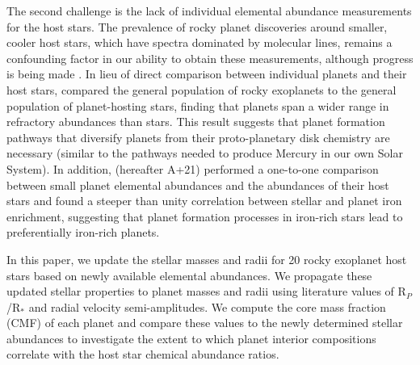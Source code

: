 \documentclass[twocolumn]{aastex631}
\begin{document}
The second challenge is the lack of individual elemental abundance measurements for the host stars. The prevalence of rocky planet discoveries around smaller, cooler host stars, which have spectra dominated by molecular lines, remains a confounding factor in our ability to obtain these measurements, although progress is being made \citep[eg.][]{2023ApJ...949...79H}. In lieu of direct comparison between individual planets and their host stars, \citet{Plotnykov2020} compared the general population of rocky exoplanets to the general population of planet-hosting stars, finding that planets span a wider range in refractory abundances than stars. This result suggests that planet formation pathways that diversify planets from their proto-planetary disk chemistry are necessary (similar to the pathways needed to produce Mercury in our own Solar System). In addition, \citet{Adibekyan2021} (hereafter A+21) performed a one-to-one comparison between small planet elemental abundances and the abundances of their host stars and found a steeper than unity correlation between stellar and planet iron enrichment, suggesting that planet formation processes in iron-rich stars lead to preferentially iron-rich planets.

In this paper, we update the stellar masses and radii for 20 rocky exoplanet host stars based on newly available elemental abundances. We propagate these updated stellar properties to planet masses and radii using literature values of R$_{P}$/R$_{*}$ and radial velocity semi-amplitudes. We compute the core mass fraction (CMF) of each planet and compare these values to the newly determined stellar abundances to investigate the extent to which planet interior compositions correlate with the host star chemical abundance ratios.
\end{document}
